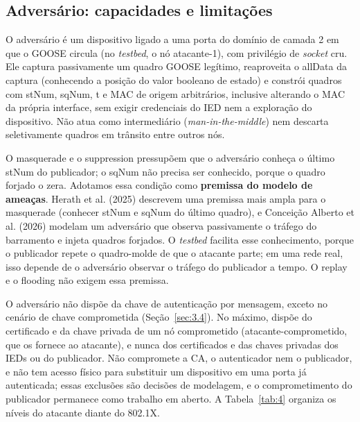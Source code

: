 \documentclass[12pt]{article}
\newcommand{\citn}[2]{#1\nocite{#2}}
\begin{document}
\subsection{Adversário: capacidades e limitações}\label{sec:3.2}

O adversário é um dispositivo ligado a uma porta do domínio de camada 2 em que o GOOSE circula (no \emph{testbed}, o nó atacante-1), com privilégio de \emph{socket} cru. Ele captura passivamente um quadro GOOSE legítimo, reaproveita o allData da captura (conhecendo a posição do valor booleano de estado) e constrói quadros com stNum, sqNum, t e MAC de origem arbitrários, inclusive alterando o MAC da própria interface, sem exigir credenciais do IED nem a exploração do dispositivo. Não atua como intermediário (\emph{man-in-the-middle}) nem descarta seletivamente quadros em trânsito entre outros nós.

O masquerade e o suppression pressupõem que o adversário conheça o último stNum do publicador; o sqNum não precisa ser conhecido, porque o quadro forjado o zera. Adotamos essa condição como \textbf{premissa do modelo de ameaças}. \citn{Herath et al. (2025)}{herath2025evaluation} descrevem uma premissa mais ampla para o masquerade (conhecer stNum e sqNum do último quadro), e \citn{Conceição Alberto et al. (2026)}{alberto2026gooseidrs} modelam um adversário que observa passivamente o tráfego do barramento e injeta quadros forjados. O \emph{testbed} facilita esse conhecimento, porque o publicador repete o quadro-molde de que o atacante parte; em uma rede real, isso depende de o adversário observar o tráfego do publicador a tempo. O replay e o flooding não exigem essa premissa.

O adversário não dispõe da chave de autenticação por mensagem, exceto no cenário de chave comprometida (Seção~\ref{sec:3.4}). No máximo, dispõe do certificado e da chave privada de um nó comprometido (atacante-comprometido, que os fornece ao atacante), e nunca dos certificados e das chaves privadas dos IEDs ou do publicador. Não compromete a CA, o autenticador nem o publicador, e não tem acesso físico para substituir um dispositivo em uma porta já autenticada; essas exclusões são decisões de modelagem, e o comprometimento do publicador permanece como trabalho em aberto. A Tabela~\ref{tab:4} organiza os níveis do atacante diante do 802.1X.
\end{document}
